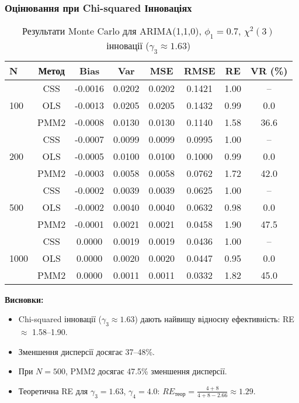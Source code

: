 \documentclass[12pt,a4paper]{article}
\begin{document}
	\subsubsection{Оцінювання при Chi-squared Інноваціях}
	
	\begin{table}[h]
		\centering
		\caption{Результати Monte Carlo для ARIMA(1,1,0), $\phi_1 = 0.7$, $\chi^2(3)$ інновації ($\gamma_3 \approx 1.63$)}
		\label{tab:arima110_chisq}
		\begin{tabular}{@{}lccccccc@{}}
			\toprule
			\textbf{N} & \textbf{Метод} & \textbf{Bias} & \textbf{Var} & \textbf{MSE} & \textbf{RMSE} & \textbf{RE} & \textbf{VR (\%)} \\
			\midrule
			\multirow{3}{*}{100} & CSS  & -0.0016 & 0.0202 & 0.0202 & 0.1421 & 1.00 & -- \\
			& OLS  & -0.0013 & 0.0205 & 0.0205 & 0.1432 & 0.99 & 0.0 \\
			& PMM2 & -0.0008 & 0.0130 & 0.0130 & 0.1140 & 1.58 & 36.6 \\
			\midrule
			\multirow{3}{*}{200} & CSS  & -0.0007 & 0.0099 & 0.0099 & 0.0995 & 1.00 & -- \\
			& OLS  & -0.0005 & 0.0100 & 0.0100 & 0.1000 & 0.99 & 0.0 \\
			& PMM2 & -0.0003 & 0.0058 & 0.0058 & 0.0762 & 1.72 & 42.0 \\
			\midrule
			\multirow{3}{*}{500} & CSS  & -0.0002 & 0.0039 & 0.0039 & 0.0625 & 1.00 & -- \\
			& OLS  & -0.0002 & 0.0040 & 0.0040 & 0.0632 & 0.98 & 0.0 \\
			& PMM2 & -0.0001 & 0.0021 & 0.0021 & 0.0458 & 1.90 & 47.5 \\
			\midrule
			\multirow{3}{*}{1000} & CSS  & 0.0000 & 0.0019 & 0.0019 & 0.0436 & 1.00 & -- \\
			& OLS  & 0.0000 & 0.0020 & 0.0020 & 0.0447 & 0.95 & 0.0 \\
			& PMM2 & 0.0000 & 0.0011 & 0.0011 & 0.0332 & 1.82 & 45.0 \\
			\bottomrule
		\end{tabular}
	\end{table}
	
	\textbf{Висновки:}
	\begin{itemize}
		\item Chi-squared інновації ($\gamma_3 \approx 1.63$) дають найвищу відносну ефективність: RE $\approx$ 1.58--1.90.
		\item Зменшення дисперсії досягає 37--48\%.
		\item При $N = 500$, PMM2 досягає 47.5\% зменшення дисперсії.
		\item Теоретична RE для $\gamma_3 = 1.63$, $\gamma_4 = 4.0$: $RE_{\text{теор}} = \frac{4+8}{4+8-2.66} \approx 1.29$.
	\end{itemize}
	
\end{document}
